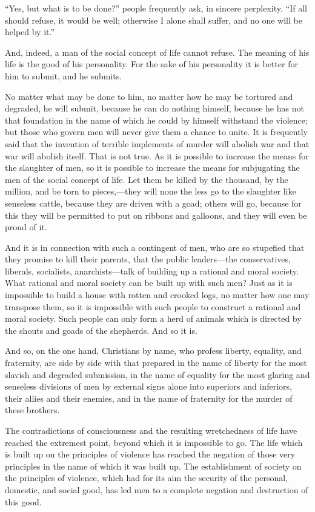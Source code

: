 \documentclass{book}
\begin{document}
“Yes, but what is to be done?” people frequently ask, in sincere perplexity. “If all should refuse, it would be well; otherwise I alone shall suffer, and no one will be helped by it.”

And, indeed, a man of the social concept of life cannot refuse. The meaning of his life is the good of his personality. For the sake of his personality it is better for him to submit, and he submits.

No matter what may be done to him, no matter how he may be tortured and degraded, he will submit, because he can do nothing himself, because he has not that foundation in the name of which he could by himself withstand the violence; but those who govern men will never give them a chance to unite. It is frequently said that the invention of terrible implements of murder will abolish war and that war will abolish itself. That is not true. As it is possible to increase the means for the slaughter of men, so it is possible to increase the means for subjugating the men of the social concept of life. Let them be killed by the thousand, by the million, and be torn to pieces,—they will none the less go to the slaughter like senseless cattle, because they are driven with a goad; others will go, because for this they will be permitted to put on ribbons and galloons, and they will even be proud of it.

And it is in connection with such a contingent of men, who are so stupefied that they promise to kill their parents, that the public leaders—the conservatives, liberals, socialists, anarchists—talk of building up a rational and moral society. What rational and moral society can be built up with such men? Just as it is impossible to build a house with rotten and crooked logs, no matter how one may transpose them, so it is impossible with such people to construct a rational and moral society. Such people can only form a herd of animals which is directed by the shouts and goads of the shepherds. And so it is.

And so, on the one hand, Christians by name, who profess liberty, equality, and fraternity, are side by side with that prepared in the name of liberty for the most slavish and degraded submission, in the name of equality for the most glaring and senseless divisions of men by external signs alone into superiors and inferiors, their allies and their enemies, and in the name of fraternity for the murder of these brothers.\footnotemark[1]

The contradictions of consciousness and the resulting wretchedness of life have reached the extremest point, beyond which it is impossible to go. The life which is built up on the principles of violence has reached the negation of those very principles in the name of which it was built up. The establishment of society on the principles of violence, which had for its aim the security of the personal, domestic, and social good, has led men to a complete negation and destruction of this good.
\end{document}
